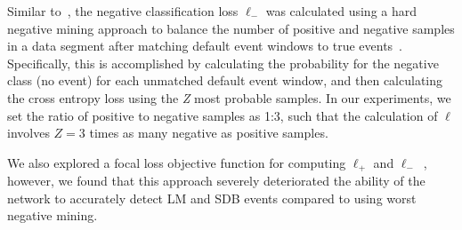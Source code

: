 Similar to~\cite{Chambon2018b, Chambon2019}, the negative classification loss $\ell_{-}$ was calculated using a hard negative mining approach to balance the number of positive and negative samples in a data segment after matching default event windows to true events~\cite{Liu2016}.
Specifically, this is accomplished by calculating the probability for the negative class (no event) for each unmatched default event window, and then calculating the cross entropy loss using the \textit{Z} most probable samples.
In our experiments, we set the ratio of positive to negative samples as 1:3, such that the calculation of $\ell$ involves $Z=3$ times as many negative as positive samples.

We also explored a focal loss objective function for computing $\ell_{+}$ and $\ell_{-}$~\cite{Lin2020}, however, we found that this approach severely deteriorated the ability of the network to accurately detect \ac{LM} and \ac{SDB} events compared to using worst negative mining.

